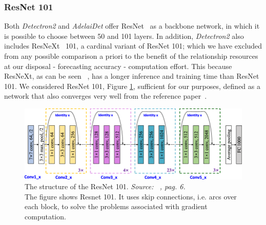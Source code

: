 \documentclass[10pt,twocolumn,letterpaper]{article}
\begin{document}
\subsubsection{ResNet 101}
Both \textit{Detectron2} and \textit{AdelaiDet} offer ResNet~\cite{Authors5_ResNet} as a backbone network, in which it is possible to choose between 50 and 101 layers.  In addition, \textit{Detectron2} also includes ResNeXt~\cite{resxt} 101, a cardinal variant of ResNet 101; which we have excluded from any possible comparison a priori to the benefit of the relationship resources at our disposal - forecasting accuracy - computation effort. This because ResNeXt, as can be seen ~\cite{Authors1_maskrcnn, resxt}, has a longer inference and training time than ResNet 101.
We considered ResNet 101, Figure \ref{fig:resnet101}, sufficient for our purposes, defined as a network that also converges very well from the reference paper~\cite{Authors5_ResNet}.
\begin{figure}[H]
\centering
  \includegraphics[width=0.90\linewidth]{./image/resnet101.png} 
  \caption{The structure of the ResNet 101. \textit{Source: ~\cite{resnet101_img}, pag. 6.}\\
  The figure shows Resnet 101. It uses skip connections, i.e. arcs over each block, to solve the problems associated with gradient computation.}%
  \label{fig:resnet101}
\noindent
\end{figure}
\end{document}
